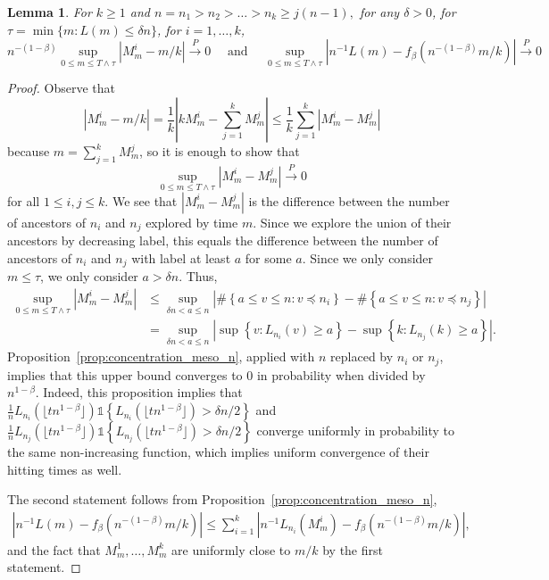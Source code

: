\documentclass[letterpaper,11pt,reqno]{amsart}
\newtheorem{lem}[thm]{Lemma}
\theoremstyle{definition}
\renewcommand{\le}{\leqslant}
\renewcommand{\ge}{\geqslant}
\newcommand{\ind}{\mathds{1}}
\newcommand{\set}[1]{\left\{#1\right\}}
\newcommand{\convp}{\stackrel{P}{\longrightarrow}}
\begin{document}
{\begin{lem}\label{lem:explore_ancestors}
 For $k\ge 1$ and $n=n_1>n_2>\dots> n_k\ge j(n-1),$ for any $\delta>0$, for $\tau=\min\{m:L(m)\le \delta n \}$, for $i=1,\dots, k$,
\[n^{-(1-\beta)}\sup_{0\le m \le T\wedge\tau} |M^i_m-m/k|\convp 0\quad \text{ and }\quad \sup_{0\le m \le T\wedge\tau}\left|n^{-1}L(m)-f_\beta(n^{-(1-\beta)}m/k)\right|\convp 0 \]
\end{lem}
\begin{proof}
Observe that 
\[|M^i_m-m/k| = \frac{1}{k}\left |kM^i_m-\sum_{j=1}^k M^j_m\right |\le \frac{1}{k}\sum_{j=1}^k |M_m^i-M_m^j|\]
because $m=\sum_{j=1}^k M^j_m$, so it is enough to show that \[\sup_{0\le m \le T\wedge\tau} |M_m^i-M_m^j|\convp 0\] for all $1\le i,j\le k$. We see that  $|M_m^i-M_m^j|$ is the difference between the number of ancestors of $n_i$ and $n_j$ explored by time $m$. Since we explore the union of their ancestors by decreasing label, this equals the difference between the number of ancestors of $n_i$ and $n_j$ with label at least $a$ for some $a$. Since we only consider $m\le \tau$, we only consider $a> \delta n$. Thus,
\begin{align*}
\sup_{0\le m \le T\wedge\tau} |M_m^i-M_m^j|&\le \sup_{\delta n < a \le n}\left|\#\left\{a \le v \le n: v\preceq n_i\right\}-\#\left\{a \le v \le n: v\preceq n_j\right\}\right|\\
&= \sup_{\delta n<a \le n}\left|\sup\left\{v:L_{n_i}(v)\ge a\right\}-\sup\left\{k:L_{n_j}(k)\ge a\right\}\right|.
\end{align*}
 Proposition~\ref{prop:concentration_meso_n}, applied with $n$ replaced by $n_i$ or $n_j$, implies that this upper bound converges to $0$ in probability when divided by $n^{1-\beta}$. Indeed, this proposition implies that $\frac{1}{n}L_{n_i}(\lfloor t n^{1-\beta}\rfloor)\ind\set{L_{n_i}(\lfloor t n^{1-\beta}\rfloor)>\delta n/2 }$ and $\frac{1}{n}L_{n_j}(\lfloor t n^{1-\beta}\rfloor)\ind\set{L_{n_j}(\lfloor t n^{1-\beta}\rfloor)>\delta n/2 }$ converge uniformly in probability to the same non-increasing function, which implies uniform convergence of their hitting times as well. 
 
The second statement follows from Proposition~\ref{prop:concentration_meso_n},
\begin{align*}\left|n^{-1}L(m)-f_{\beta}(n^{-(1-\beta)}m/k)\right| \le  \sum_{i=1}^k\left|n^{-1}L_{n_i}(M^i_m)-f_\beta(n^{-(1-\beta)}m/k)\right| ,\end{align*}
 and the fact that $M^1_m,\dots, M^k_m$ are uniformly close to $m/k$ by the first statement. 
\end{proof}


}
\end{document}
